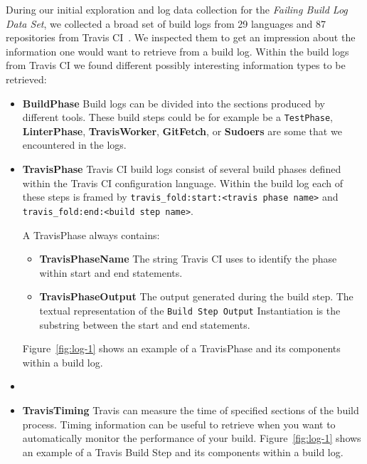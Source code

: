 \documentclass[\myrootdir/main.tex]{subfiles}
\begin{document}
During our initial exploration and log data collection for the \emph{Failing Build Log Data Set}, we collected a broad set of build logs from 29 languages and 87 repositories from Travis CI~\cite{travisci2019webpage}.
We inspected them to get an impression about the information one would want to retrieve from a build log.
Within the build logs from Travis CI we found different possibly interesting information types to be retrieved:

\begin{itemize}
	\item \textbf{BuildPhase} Build logs can be divided into the sections produced by different tools.
	      These build steps could be for example be a \texttt{TestPhase}, \textbf{LinterPhase}, \textbf{TravisWorker}, \textbf{GitFetch}, or \textbf{Sudoers} are some that we encountered in the logs.

	\item \textbf{TravisPhase} Travis CI build logs consist of several build phases defined within the Travis CI configuration language. Within the build log each of these steps is framed by \lstinline{travis_fold:start:<travis phase name>} and \\ \lstinline{travis_fold:end:<build step name>}.

	      A TravisPhase always contains:
	      \begin{itemize}
		      \item \textbf{TravisPhaseName} The string Travis CI uses to identify the phase within start and end statements.
		      \item \textbf{TravisPhaseOutput} The output generated during the build step. The textual representation of the \texttt{Build Step Output} Instantiation is the substring between the start and end statements.
	      \end{itemize}
	       Figure~\ref{fig:log-1} shows an example of a TravisPhase and its components within a build log.

	\item
	\item \textbf{TravisTiming} Travis can measure the time of specified sections of the build process.
	      Timing information can be useful to retrieve when you want to automatically monitor the performance of your build.
	      Figure~\ref{fig:log-1} shows an example of a Travis Build Step and its components within a build log.


\end{itemize}
\end{document}
